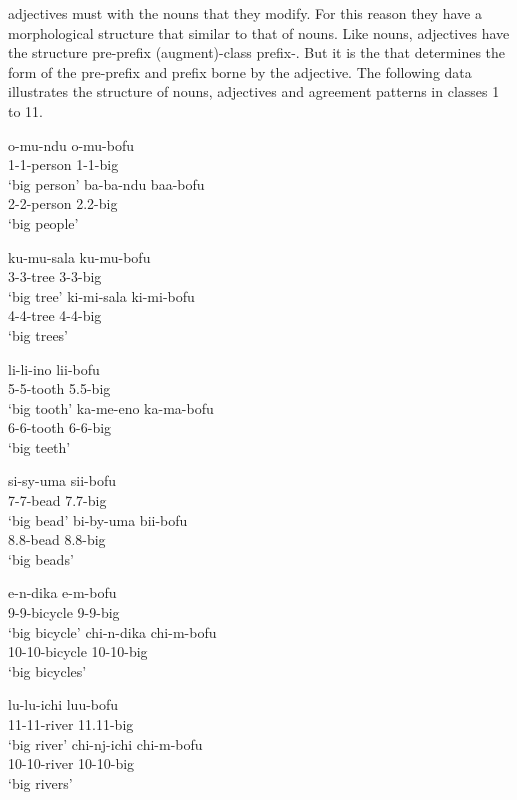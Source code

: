 \documentclass[output=paper,
modfonts
]{langscibook}
\begin{document}
 adjectives must  with the nouns that they modify. For this reason they have a morphological structure that similar to that of nouns. Like nouns, adjectives have the structure pre-prefix (augment)-class prefix-. But it is the  that determines the form of the pre-prefix and prefix borne by the adjective. The following data illustrates the structure of nouns, adjectives and agreement patterns in  classes 1 to 11.

\ea\label{ex:wasike:5}
\ea
\gll o-mu-ndu o-mu-bofu\\
     1-1-person 1-1-big\\
\glt ‘big person’
\ex
\gll  ba-ba-ndu baa-bofu\\
     2-2-person 2.2-big\\
\glt ‘big people’
\z
\z


\ea\label{ex:wasike:6}
\ea
\gll ku-mu-sala ku-mu-bofu\\
     3-3-tree 3-3-big\\
\glt ‘big tree’
\ex
\gll  ki-mi-sala ki-mi-bofu\\
     4-4-tree 4-4-big\\
\glt ‘big trees’
\z
\z

\ea\label{ex:wasike:7}
\ea
\gll li-li-ino lii-bofu\\
     5-5-tooth 5.5-big\\
\glt ‘big tooth’
\ex
\gll  ka-me-eno ka-ma-bofu\\
     6-6-tooth 6-6-big\\
\glt ‘big teeth’
\z
\z

\ea\label{ex:wasike:8}
\ea
\gll si-sy-uma sii-bofu\\
     7-7-bead 7.7-big\\
\glt ‘big bead’
\ex
\gll  bi-by-uma bii-bofu\\
     8.8-bead 8.8-big\\
\glt ‘big beads’
\z
\z

\ea\label{ex:wasike:9}
\ea
\gll e-n-dika e-m-bofu\\
     9-9-bicycle 9-9-big\\
\glt ‘big bicycle’
\ex
\gll  chi-n-dika chi-m-bofu\\
     10-10-bicycle 10-10-big\\
\glt ‘big bicycles’
\z
\z

\ea\label{ex:wasike:10}
\ea
\gll lu-lu-ichi luu-bofu\\
     11-11-river 11.11-big\\
\glt ‘big river’
\ex
\gll  chi-nj-ichi chi-m-bofu\\
     10-10-river 10-10-big\\
\glt ‘big rivers’
\z
\z
\end{document}
